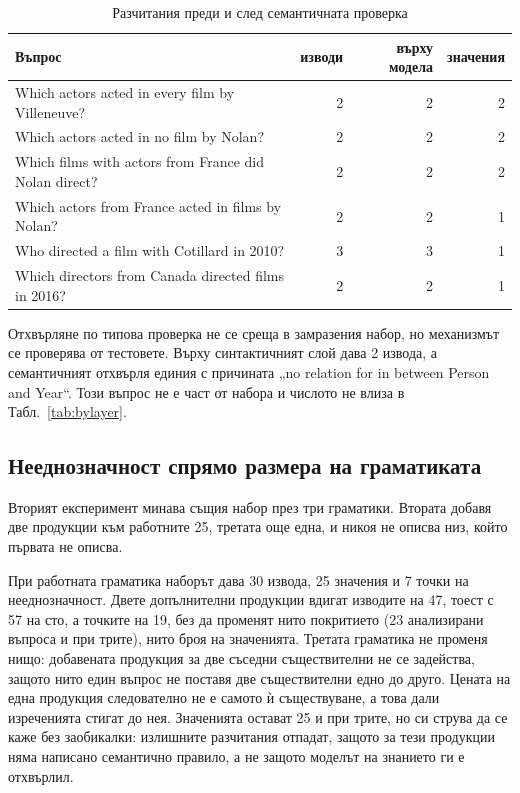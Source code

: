 \begin{table}[H]
\caption{Разчитания преди и след семантичната проверка}
\label{tab:ambiguity}
\centering
\begin{tabular}{@{}L{7.4cm}rrr@{}}
\toprule
\textbf{Въпрос} & \textbf{изводи} & \textbf{върху модела} & \textbf{значения} \\
\midrule
Which actors acted in every film by Villeneuve? & 2 & 2 & 2 \\
Which actors acted in no film by Nolan? & 2 & 2 & 2 \\
Which films with actors from France did Nolan direct? & 2 & 2 & 2 \\
Which actors from France acted in films by Nolan? & 2 & 2 & 1 \\
Who directed a film with Cotillard in 2010? & 3 & 3 & 1 \\
Which directors from Canada directed films in 2016? & 2 & 2 & 1 \\
\bottomrule
\end{tabular}
\end{table}

Отхвърляне по типова проверка не се среща в замразения набор, но механизмът се проверява
от тестовете. Върху  синтактичният
слой дава 2 извода, а семантичният отхвърля единия с причината „no relation for in between
Person and Year“. Този въпрос не е част от набора и числото не влиза в
Табл.~\ref{tab:bylayer}.

\subsection{Нееднозначност спрямо размера на граматиката}

Вторият експеримент минава същия набор през три граматики. Втората добавя две продукции към
работните 25, третата още една, и никоя не описва низ, който първата не описва.

При работната граматика наборът дава 30 извода, 25 значения и 7 точки на нееднозначност.
Двете допълнителни продукции вдигат изводите на 47, тоест с 57 на сто, а точките на 19, без
да променят нито покритието (23 анализирани въпроса и при трите), нито броя на значенията.
Третата граматика не променя нищо: добавената продукция за две съседни съществителни не се
задейства, защото нито един въпрос не поставя две съществителни едно до друго. Цената на
една продукция следователно не е самото ѝ съществуване, а това дали изреченията стигат до
нея. Значенията остават 25 и при трите, но си струва да се каже без заобикалки: излишните
разчитания отпадат, защото за тези продукции няма написано семантично правило, а не защото
моделът на знанието ги е отхвърлил.

